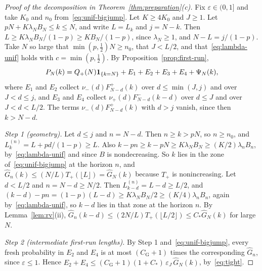 \begin{proof}[Proof of the decomposition in Theorem~\ref{thm:preparation}(c)]
Fix $\varepsilon\in(0,1]$ and take $K_0$ and $n_0$ from~\eqref{eq:unif-bigjump}. Let
$K\ge4K_0$ and $J\ge1$. Let $pN+K\lambda_NB_N\le k\le N$, and write $L=L_k$ and
$j=N-k$. Then $L\ge K\lambda_NB_N/(1-p)\ge KB_N/(1-p)$, since $\lambda_N\ge1$, and
$N-L=j/(1-p)$. Take $N$ so large that $\min(p,\frac12)N\ge n_0$, that $J<L/2$, and
that~\eqref{eq:lambda-unif} holds with $c=\min(p,\frac12)$.
By Proposition~\ref{prop:first-run},
\[
 P_N(k)=Q_{+}(N)\mathbf{1}_{\{k=N\}}+E_1+E_2+E_3+E_4+\Psi_N(k),
\]
where $E_1$ and $E_2$ collect $\nu_\minus(d)F^\plus_{N-d}(k)$ over $d\le\min(J,j)$ and
over $J<d\le j$, and $E_3$ and $E_4$ collect $\nu_\plus(d)F^\minus_{N-d}(k-d)$ over
$d\le J$ and over $J<d<L/2$. The terms $\nu_\minus(d)F^\plus_{N-d}(k)$ with $d>j$
vanish, since then $k>N-d$.

\emph{Step 1 (geometry).} Let $d\le j$ and $n=N-d$. Then $n\ge k>pN$, so
$n\ge n_0$, and $L^{(n)}_k=L+pd/(1-p)\ge L$. Also
$k-pn\ge k-pN\ge K\lambda_NB_N\ge(K/2)\lambda_nB_n$, by~\eqref{eq:lambda-unif} and
since $B$ is nondecreasing. So $k$ lies in the zone of~\eqref{eq:unif-bigjump} at the
horizon $n$, and $\widehat G_n(k)\le(N/L)T_\plus(\lfloor L\rfloor)=\widehat G_N(k)$
because $T_\plus$ is nonincreasing. Let $d<L/2$ and $n=N-d\ge N/2$. Then
$L^{(n)}_{k-d}=L-d\ge L/2$, and
$(k-d)-pn=(1-p)(L-d)\ge K\lambda_NB_N/2\ge(K/4)\lambda_nB_n$, again
by~\eqref{eq:lambda-unif}, so $k-d$ lies in that zone at the horizon $n$. By
Lemma~\ref{lem:rv}(ii), $\widehat G_n(k-d)\le(2N/L)T_\plus(\lfloor L/2\rfloor)\le
C_*\widehat G_N(k)$ for large $N$.

\emph{Step 2 (intermediate first-run lengths).} By Step 1
and~\eqref{eq:unif-bigjump}, every fresh probability in $E_2$ and $E_4$ is at most
$(C_{\mathrm G}+1)$ times the corresponding $\widehat G_n$, since $\varepsilon\le1$.
Hence $E_2+E_4\le(C_{\mathrm G}+1)(1+C_*)\,\varepsilon_J\,\widehat G_N(k)$, by~\eqref{eq:tight}.


\end{proof}
